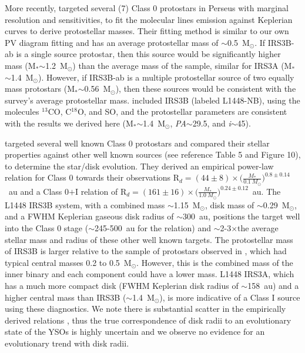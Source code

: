 \documentclass[twocolumn, 12pt,trackchanges]{aastex63}
\newcommand{\ceo}{C$^{18}$O}
\newcommand{\tco}{$^{13}$CO}
\renewcommand{\deg}{\degr}
\newcommand{\ab}{$\sim$}
\newcommand{\mstar}{M$_{*}$}
\newcommand{\solm}{M$_{\odot}$}
\newcommand{\msun}{M$_{\odot}$}
\begin{document}
More recently, \citet{2020AA...635A..15M}\space targeted several (7) Class 0 protostars in Perseus with marginal resolution and sensitivities, to fit the molecular lines emission against Keplerian curves to derive protostellar masses. Their fitting method is similar to our own PV diagram fitting and has an average protostellar mass of \ab0.5~\msun. If IRS3B-ab is a single source protostar, then this source would be significantly higher mass (\mstar\ab1.2~\msun) than the average mass of the sample, similar for IRS3A (\mstar\ab1.4~\msun). However, if IRS3B-ab is a multiple protostellar source of two equally mass protostars (\mstar\ab0.56~\msun), then these sources would be consistent with the survey's average protostellar mass.
\citet{2020AA...635A..15M}\space {} included IRS3B (labeled L1448-NB), using the molecules \tco, \ceo, and SO, and the protostellar parameters are consistent with the results we derived here (\mstar\ab1.4~\msun, \textit{PA}\ab29.5\deg, and \textit{i}\ab45\deg).

\citet[][]{2017ApJ...834..178Y} targeted several well known Class 0 protostars and compared their stellar properties against other well known sources (see reference Table 5 and Figure 10), to determine the star/disk evolution. They derived an empirical power-law relation for Class 0 towards their observations R$_{d}=(44\pm8)\times\big(\frac{M_{*}}{0.1~M_{\odot}}\big)^{0.8\pm0.14}$~au and a Class 0$+$I relation of R$_{d}=(161\pm16)\times\big(\frac{M_{*}}{1.0~M_{\odot}}\big)^{0.24\pm0.12}$~au. The L1448 IRS3B system, with a combined mass \ab1.15~\solm, disk mass of \ab0.29~\solm, and a FWHM Keplerian gaseous disk radius of \ab300~au, positions the target well into the Class 0 stage (\ab245-500~au for the \citet[][]{2017ApJ...834..178Y} relation) and \ab2-3$\times$\space the average stellar mass and radius of these other well known targets. The protostellar mass of IRS3B is larger relative to the sample of protostars observed in \citet[][]{2017ApJ...834..178Y}, which had typical central masses 0.2 to 0.5~\solm. However, this is the combined mass of the inner binary and each component could have a lower mass. L1448 IRS3A, which has a much more compact disk (FWHM Keplerian disk radius of \ab158~au) and a higher central mass than IRS3B (\ab1.4~\solm), is more indicative of a Class I source using these diagnostics. We note there is substantial scatter in the empirically derived relations \citep{2020ApJ...890..130T}, thus the true correspondence of disk radii to an evolutionary state of the YSOs is highly uncertain and we observe no evidence for an evolutionary trend with disk radii.
\end{document}
